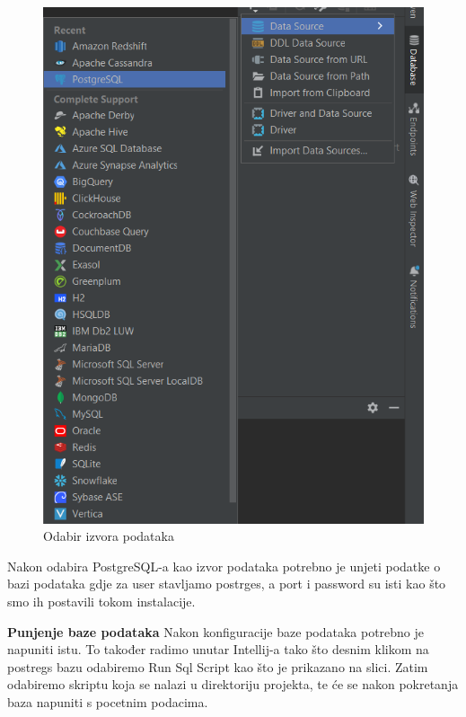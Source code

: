 			\begin{figure}[H]
				\includegraphics[scale=0.3]{slike/postgreSql.png} 
				\centering
				\caption{Odabir izvora podataka}
				\label{fig:promjene}
			\end{figure}
			Nakon odabira PostgreSQL-a kao izvor podataka potrebno je unjeti podatke o bazi podataka gdje za user stavljamo postrges, a port i password su isti kao što smo ih postavili tokom instalacije.
			
			\textbf{Punjenje baze podataka}
			Nakon konfiguracije baze podataka potrebno je napuniti istu. To također radimo unutar Intellij-a tako što desnim klikom na postregs bazu odabiremo Run Sql Script kao što je prikazano na slici. Zatim odabiremo skriptu koja se nalazi u direktoriju projekta, te će se nakon pokretanja baza napuniti s pocetnim podacima.
			
